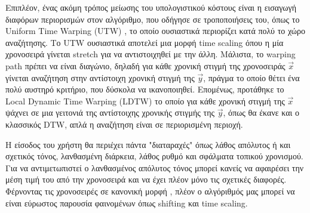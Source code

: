 Επιπλέον, ένας ακόμη τρόπος μείωσης του υπολογιστικού κόστους είναι η εισαγωγή διαφόρων περιορισμών στον αλγόριθμο, που οδήγησε σε τροποποιήσεις του, όπως το Uniform Time Warping (UTW) \cite{Zhu:2003:WIE:872757.872780}, το οποίο ουσιαστικά περιορίζει κατά πολύ το χώρο αναζήτησης. 
Το UTW ουσιαστικά αποτελεί μια μορφή time scaling όπου η μία χρονοσειρά γίνεται stretch για να αντιστοιχηθεί με την άλλη.
Μάλιστα, το warping path πρέπει να είναι διαγώνιο, δηλαδή για κάθε χρονική στιγμή της χρονοσειράς $\vec x$ γίνεται αναζήτηση στην αντίστοιχη χρονική στιγμή της $\vec y$, πράγμα το οποίο θέτει ένα πολύ αυστηρό κριτήριο, που δύσκολα να ικανοποιηθεί.
Επομένως, προτάθηκε το Local Dynamic Time Warping (LDTW) \cite{Zhu:2003:WIE:872757.872780} το οποίο για κάθε χρονική στιγμή της $\vec x$ ψάχνει σε μια γειτονιά της αντίστοιχης χρονικής στιγμής της $\vec y$, όπως θα έκανε και ο κλασσικός DTW, απλά η αναζήτηση είναι σε περιορισμένη περιοχή.

Η είσοδος του χρήστη θα περιέχει πάντα "διαταραχές" όπως λάθος απόλυτος ή και σχετικός τόνος, λανθασμένη διάρκεια, λάθος ρυθμό και σφάλματα τοπικού χρονισμού.
Για να αντιμετωπιστεί ο λανθασμένος απόλυτος τόνος μπορεί κανείς να αφαιρέσει την μέση τιμή του από την χρονοσειρά και να έχει πλέον μόνο τις σχετικές διαφορές. Φέρνοντας τις χρονοσειρές σε κανονική μορφή \cite{goldin1995similarity}, πλέον ο αλγόριθμός μας μπορεί να είναι εύρωστος παρουσία φαινομένων όπως shifting και time scaling. 
